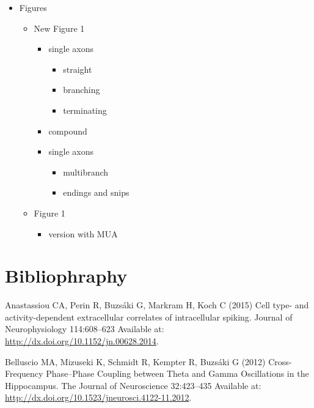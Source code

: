 \documentclass[]{article}
\providecommand{\tightlist}{%
  \setlength{\itemsep}{0pt}\setlength{\parskip}{0pt}}
\begin{document}
\begin{itemize}
\tightlist
\item
  Figures

  \begin{itemize}
  \tightlist
  \item
    New Figure 1

    \begin{itemize}
    \tightlist
    \item
      single axons

      \begin{itemize}
      \tightlist
      \item
        straight
      \item
        branching
      \item
        terminating
      \end{itemize}
    \item
      compound
    \item
      single axons

      \begin{itemize}
      \tightlist
      \item
        multibranch
      \item
        endings and snips
      \end{itemize}
    \end{itemize}
  \item
    Figure 1

    \begin{itemize}
    \tightlist
    \item
      version with MUA
    \end{itemize}
  \end{itemize}
\end{itemize}

\section*{Bibliophraphy}\label{bibliophraphy}

\hypertarget{refs}{}
\hypertarget{ref-Anastassiou2015Cell}{}
Anastassiou CA, Perin R, Buzsáki G, Markram H, Koch C (2015) Cell type-
and activity-dependent extracellular correlates of intracellular
spiking. Journal of Neurophysiology 114:608--623 Available at:
\url{http://dx.doi.org/10.1152/jn.00628.2014}.

\hypertarget{ref-Belluscio2012CrossFrequency}{}
Belluscio MA, Mizuseki K, Schmidt R, Kempter R, Buzsáki G (2012)
Cross-Frequency Phase--Phase Coupling between Theta and Gamma
Oscillations in the Hippocampus. The Journal of Neuroscience 32:423--435
Available at: \url{http://dx.doi.org/10.1523/jneurosci.4122-11.2012}.
\end{document}
